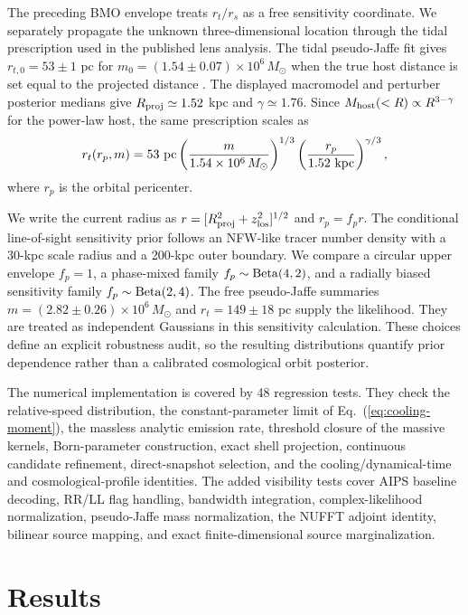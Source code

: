 \documentclass[12pt]{iopart}
\newcommand{\Msun}{M_\odot}
\begin{document}
The preceding BMO envelope treats $r_t/r_s$ as a free sensitivity coordinate.
We separately propagate the unknown three-dimensional location through the
tidal prescription used in the published lens analysis.  The tidal
pseudo-Jaffe fit gives $r_{t,0}=53\pm1$ pc for
$m_0=(1.54\pm0.07)\times10^6\,\Msun$ when the true host distance is set equal
to the projected distance \citep{Powell2025}.  The displayed macromodel and
perturber posterior medians give $R_{\rm proj}\simeq1.52$ kpc and
$\gamma\simeq1.76$.  Since $M_{\rm host}(<R)\propto R^{3-\gamma}$ for the
power-law host, the same prescription scales as
\begin{equation}
 r_t(r_p,m)=53\ {\rm pc}
 \left(\frac{m}{1.54\times10^6\,\Msun}\right)^{1/3}
 \left(\frac{r_p}{1.52\ {\rm kpc}}\right)^{\gamma/3},
 \label{eq:host-tidal-scaling}
\end{equation}
where $r_p$ is the orbital pericenter.

We write the current radius as
$r=[R_{\rm proj}^2+z_{\rm los}^2]^{1/2}$ and $r_p=f_p r$.  The conditional
line-of-sight sensitivity prior follows an NFW-like tracer number density
with a 30-kpc scale radius and a 200-kpc outer boundary.  We compare a circular
upper envelope $f_p=1$, a phase-mixed family
$f_p\sim{\rm Beta}(4,2)$, and a radially biased sensitivity family
$f_p\sim{\rm Beta}(2,4)$.  The free pseudo-Jaffe summaries
$m=(2.82\pm0.26)\times10^6\,\Msun$ and $r_t=149\pm18$ pc supply the likelihood.
They are treated as independent Gaussians in this sensitivity calculation.
These choices define an explicit robustness audit, so the resulting
distributions quantify prior dependence rather than a calibrated cosmological
orbit posterior.

The numerical implementation is covered by 48 regression tests.  They check
the relative-speed distribution, the constant-parameter limit of
Eq.~(\ref{eq:cooling-moment}), the massless analytic emission rate, threshold
closure of the massive kernels, Born-parameter construction, exact shell
projection, continuous candidate refinement, direct-snapshot selection, and
the cooling/dynamical-time and cosmological-profile identities.  The added
visibility tests cover AIPS baseline decoding, RR/LL flag handling,
bandwidth integration, complex-likelihood normalization, pseudo-Jaffe mass
normalization, the NUFFT adjoint identity, bilinear source mapping, and exact
finite-dimensional source marginalization.

\section{Results}
\label{sec:results}
\end{document}
